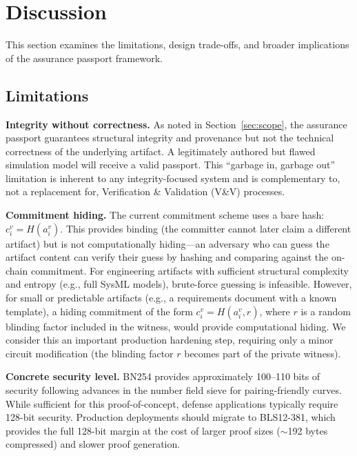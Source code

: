 \section{Discussion}
\label{sec:discussion}

This section examines the limitations, design trade-offs, and broader implications of the assurance passport framework.

\subsection{Limitations}
\label{sec:discussion-limitations}

\textbf{Integrity without correctness.}
As noted in Section~\ref{sec:scope}, the assurance passport guarantees structural integrity and provenance but not the technical correctness of the underlying artifact.
A legitimately authored but flawed simulation model will receive a valid passport.
This ``garbage in, garbage out'' limitation is inherent to any integrity-focused system and is complementary to, not a replacement for, Verification \& Validation (V\&V) processes.

\textbf{Commitment hiding.}
The current commitment scheme uses a bare hash: $c_i^{v} = H(a_i^{v})$.
This provides binding (the committer cannot later claim a different artifact) but is not computationally hiding---an adversary who can guess the artifact content can verify their guess by hashing and comparing against the on-chain commitment.
For engineering artifacts with sufficient structural complexity and entropy (e.g., full SysML models), brute-force guessing is infeasible.
However, for small or predictable artifacts (e.g., a requirements document with a known template), a hiding commitment of the form $c_i^{v} = H(a_i^{v}, r)$, where $r$ is a random blinding factor included in the witness, would provide computational hiding.
We consider this an important production hardening step, requiring only a minor circuit modification (the blinding factor $r$ becomes part of the private witness).

\textbf{Concrete security level.}
BN254 provides approximately 100--110 bits of security following advances in the number field sieve for pairing-friendly curves.
While sufficient for this proof-of-concept, defense applications typically require 128-bit security.
Production deployments should migrate to BLS12-381, which provides the full 128-bit margin at the cost of larger proof sizes ($\sim$192 bytes compressed) and slower proof generation.

